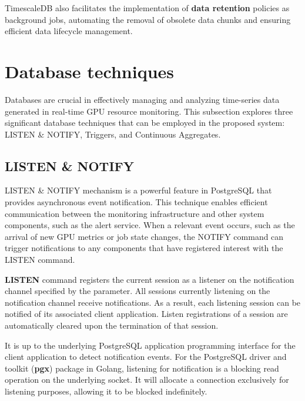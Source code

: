 
TimescaleDB also facilitates the implementation of \textbf{data retention} policies as background jobs, automating the removal of obsolete data chunks and ensuring efficient data lifecycle management.

\section{Database techniques}
Databases are crucial in effectively managing and analyzing time-series data generated in real-time GPU resource monitoring. This subsection explores three significant database techniques that can be employed in the proposed system: LISTEN \& NOTIFY, Triggers, and Continuous Aggregates.

\subsection{LISTEN \& NOTIFY}

LISTEN \& NOTIFY mechanism \cite{Shaik2023listen, postgresql-doc} is a powerful feature in PostgreSQL that provides asynchronous event notification. This technique enables efficient communication between the monitoring infrastructure and other system components, such as the alert service. When a relevant event occurs, such as the arrival of new GPU metrics or job state changes, the NOTIFY command can trigger notifications to any components that have registered interest with the LISTEN command.

\textbf{LISTEN} command registers the current session as a listener on the notification channel specified by the parameter. All sessions currently listening on the notification channel receive notifications. As a result, each listening session can be notified of its associated client application. Listen registrations of a session are automatically cleared upon the termination of that session.

It is up to the underlying PostgreSQL application programming interface for the client application to detect notification events. For the PostgreSQL driver and toolkit (\textbf{pgx}) package in Golang, listening for notification is a blocking read operation on the underlying socket. It will allocate a connection exclusively for listening purposes, allowing it to be blocked indefinitely.

